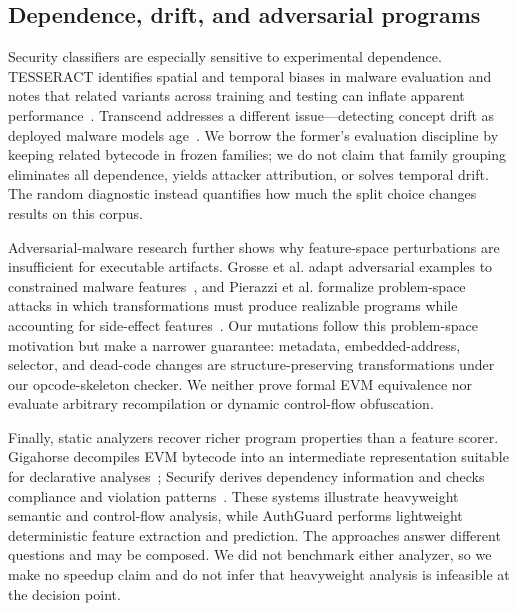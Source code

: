 \subsection{Dependence, drift, and adversarial programs}

Security classifiers are especially sensitive to experimental dependence. TESSERACT identifies spatial and temporal biases in malware evaluation and notes that related variants across training and testing can inflate apparent performance~\cite{pendlebury2019tesseract}. Transcend addresses a different issue---detecting concept drift as deployed malware models age~\cite{jordaney2017transcend}. We borrow the former's evaluation discipline by keeping related bytecode in frozen families; we do not claim that family grouping eliminates all dependence, yields attacker attribution, or solves temporal drift. The random diagnostic instead quantifies how much the split choice changes results on this corpus.

Adversarial-malware research further shows why feature-space perturbations are insufficient for executable artifacts. Grosse et al. adapt adversarial examples to constrained malware features~\cite{grosse2017adversarial}, and Pierazzi et al. formalize problem-space attacks in which transformations must produce realizable programs while accounting for side-effect features~\cite{pierazzi2020problemspace}. Our mutations follow this problem-space motivation but make a narrower guarantee: metadata, embedded-address, selector, and dead-code changes are structure-preserving transformations under our opcode-skeleton checker. We neither prove formal EVM equivalence nor evaluate arbitrary recompilation or dynamic control-flow obfuscation.

Finally, static analyzers recover richer program properties than a feature scorer. Gigahorse decompiles EVM bytecode into an intermediate representation suitable for declarative analyses~\cite{grech2019gigahorse}; Securify derives dependency information and checks compliance and violation patterns~\cite{tsankov2018securify}. These systems illustrate heavyweight semantic and control-flow analysis, while AuthGuard performs lightweight deterministic feature extraction and prediction. The approaches answer different questions and may be composed. We did not benchmark either analyzer, so we make no speedup claim and do not infer that heavyweight analysis is infeasible at the decision point.
